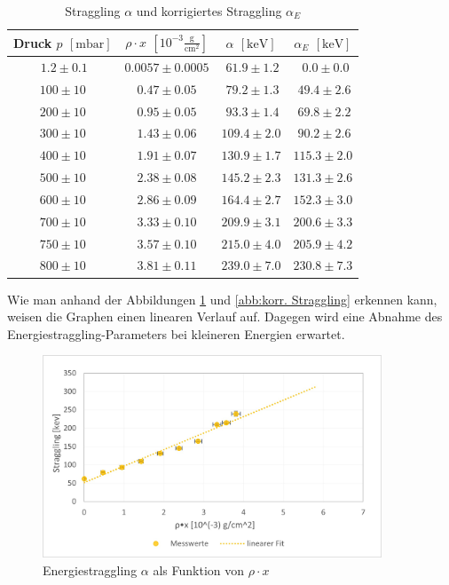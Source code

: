 \documentclass[12pt,a4paper]{scrartcl}
\numberwithin{equation}{section} %
\begin{document}
\begin{table}
	\centering
	\begin{tabular}[h]{||c|c|c|c||}
		\hline
		Druck $p$ $[\mathrm{mbar}]$
			& $\rho \cdot x$ $\left[10^{-3} \mathrm{\frac{g}{cm^2}}\right]$
			& $\alpha$ $[\mathrm{keV}]$ & $\alpha _E$ $[\mathrm{keV}]$\\
		\hline\hline
		$\ 1.2 \pm 0.1$ & $0.0057 \pm 0.0005$ & $\ 61.9 \pm 1.2$ & $\ \ 0.0 \pm 0.0$\\
		\hline
		$100 \pm 10$ & $0.47 \pm 0.05$ & $\ 79.2 \pm 1.3$ & $\ 49.4 \pm 2.6$  \\
		\hline
		$200 \pm 10$ & $0.95 \pm 0.05$ & $\ 93.3 \pm 1.4$ & $\ 69.8 \pm 2.2 $ \\
		\hline
		$300 \pm 10$ & $1.43 \pm 0.06$ & $109.4 \pm 2.0$ & $\ 90.2 \pm 2.6$\\
		\hline
		$400 \pm 10$ & $1.91 \pm 0.07$ & $130.9 \pm 1.7$ & $115.3 \pm 2.0$ \\
		\hline
		$500 \pm 10$ & $2.38 \pm 0.08$ & $145.2 \pm 2.3$ & $131.3 \pm 2.6$\\
		\hline
		$600 \pm 10$ & $2.86 \pm 0.09$ & $164.4 \pm 2.7$ & $152.3 \pm 3.0$ \\
		\hline
		$700 \pm 10$ & $3.33 \pm 0.10$ & $209.9 \pm 3.1$ & $200.6 \pm 3.3$ \\
		\hline
		$750 \pm 10$ & $3.57 \pm 0.10$ & $215.0 \pm 4.0$ & $205.9 \pm 4.2$\\
		\hline
		$800 \pm 10$ & $3.81 \pm 0.11$ & $239.0 \pm 7.0$ & $230.8 \pm 7.3$\\
		\hline
	\end{tabular}
	\caption{Straggling $\alpha$ und korrigiertes Straggling $\alpha_E$}
	\label{tabelle:korr. Straggling}
\end{table}

Wie man anhand der Abbildungen \ref{abb:Straggling} und \ref{abb:korr. Straggling}  erkennen kann, weisen die Graphen einen linearen Verlauf auf. Dagegen wird eine Abnahme des Energiestraggling-Parameters bei kleineren Energien erwartet. \cite{Prior}

\begin{figure}[h]
	\centering
	\includegraphics[width=0.9\textwidth]{../media/B3.3/Straggling.jpg}
	\caption{Energiestraggling $\alpha$ als Funktion von $\rho \cdot x$}
	\label{abb:Straggling}
\end{figure}
\end{document}
